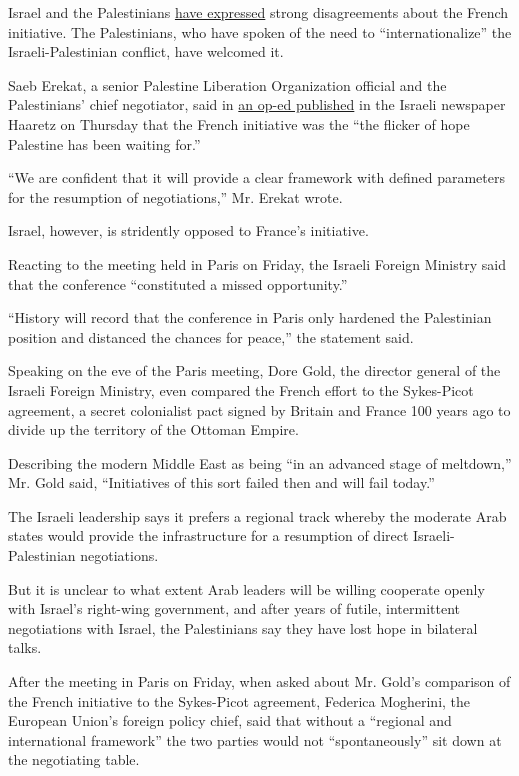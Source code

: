 Israel and the Palestinians
\href{http://www.nytimes3xbfgragh.onion/2016/05/19/world/middleeast/french-plan-for-middle-east-peace-talks-hits-a-familiar-snag.html}{have
expressed} strong disagreements about the French initiative. The
Palestinians, who have spoken of the need to ``internationalize'' the
Israeli-Palestinian conflict, have welcomed it.

Saeb Erekat, a senior Palestine Liberation Organization official and the
Palestinians' chief negotiator, said in
\href{http://www.haaretz.com/opinion/1.722924}{an op-ed published} in
the Israeli newspaper Haaretz on Thursday that the French initiative was
the ``the flicker of hope Palestine has been waiting for.''

``We are confident that it will provide a clear framework with defined
parameters for the resumption of negotiations,'' Mr. Erekat wrote.

Israel, however, is stridently opposed to France's initiative.

Reacting to the meeting held in Paris on Friday, the Israeli Foreign
Ministry said that the conference ``constituted a missed opportunity.''

``History will record that the conference in Paris only hardened the
Palestinian position and distanced the chances for peace,'' the
statement said.

Speaking on the eve of the Paris meeting, Dore Gold, the director
general of the Israeli Foreign Ministry, even compared the French effort
to the Sykes-Picot agreement, a secret colonialist pact signed by
Britain and France 100 years ago to divide up the territory of the
Ottoman Empire.

Describing the modern Middle East as being ``in an advanced stage of
meltdown,'' Mr. Gold said, ``Initiatives of this sort failed then and
will fail today.''

The Israeli leadership says it prefers a regional track whereby the
moderate Arab states would provide the infrastructure for a resumption
of direct Israeli-Palestinian negotiations.

But it is unclear to what extent Arab leaders will be willing cooperate
openly with Israel's right-wing government, and after years of futile,
intermittent negotiations with Israel, the Palestinians say they have
lost hope in bilateral talks.

After the meeting in Paris on Friday, when asked about Mr. Gold's
comparison of the French initiative to the Sykes-Picot agreement,
Federica Mogherini, the European Union's foreign policy chief, said that
without a ``regional and international framework'' the two parties would
not ``spontaneously'' sit down at the negotiating table.

